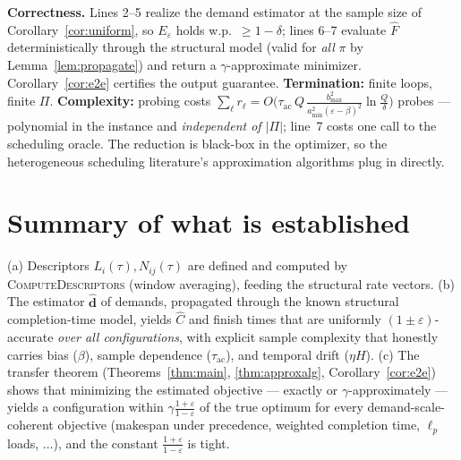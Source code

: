 \documentclass{amsart}
\theoremstyle{definition}
\newcommand{\Chat}{\widehat{C}}
\begin{document}
\noindent\textbf{Correctness.} Lines 2--5 realize the demand estimator at the
sample size of Corollary~\ref{cor:uniform}, so $E_\varepsilon$ holds w.p.\
$\ge1-\delta$; lines 6--7 evaluate $\widehat F$ deterministically through the
structural model (valid for \emph{all} $\pi$ by Lemma~\ref{lem:propagate}) and
return a $\gamma$-approximate minimizer. Corollary~\ref{cor:e2e} certifies the
output guarantee. \textbf{Termination:} finite loops, finite $\Pi$.
\textbf{Complexity:} probing costs
$\sum_\ell r_\ell=O\!\big(\tau_{\mathrm{ac}}\,Q\,\frac{b_{\max}^2}{a_{\min}^2(\varepsilon-\beta)^2}\ln\frac{Q}{\delta}\big)$
probes — polynomial in the instance and \emph{independent of $|\Pi|$}; line~7
costs one call to the scheduling oracle. The reduction is black-box in the
optimizer, so the heterogeneous scheduling literature's approximation algorithms
plug in directly.

\section{Summary of what is established}\label{sec:summary}

(a) Descriptors $L_i(\tau),N_{ij}(\tau)$ are defined and computed by
\textsc{ComputeDescriptors} (window averaging), feeding the structural rate
vectors. (b) The estimator $\widehat{\mathbf d}$ of demands, propagated through
the known structural completion-time model, yields $\Chat$ and finish times that
are uniformly $(1\pm\varepsilon)$-accurate \emph{over all configurations}, with
explicit sample complexity that honestly carries bias ($\beta$), sample
dependence ($\tau_{\mathrm{ac}}$), and temporal drift ($\eta H$). (c) The
transfer theorem (Theorems~\ref{thm:main}, \ref{thm:approxalg},
Corollary~\ref{cor:e2e}) shows that minimizing the estimated objective — exactly
or $\gamma$-approximately — yields a configuration within
$\gamma\frac{1+\varepsilon}{1-\varepsilon}$ of the true optimum for every
demand-scale-coherent objective (makespan under precedence, weighted completion
time, $\ell_p$ loads, $\dots$), and the constant $\frac{1+\varepsilon}{1-\varepsilon}$
is tight.
\end{document}
